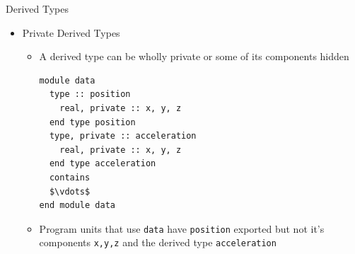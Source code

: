 \documentclass[c,mathserif,compress,xcolor=svgnames]{beamer}
\newcommand{\lstfortran}[1]{\lstinline[language={[90]Fortran},basicstyle=\footnotesize\ttfamily]|#1|}
\begin{document}
\begin{frame}{Derived Types}
\begin{itemize}
  \item Private Derived Types
    \begin{itemize}
      \item A derived type can be wholly private or some of its components hidden
        \begin{lstlisting}[language={[90]Fortran},basicstyle=\fontsize{5}{6}\selectfont\ttfamily,mathescape]
module data
  type :: position
    real, private :: x, y, z
  end type position
  type, private :: acceleration
    real, private :: x, y, z
  end type acceleration
  contains
  $\vdots$
end module data
          \end{lstlisting}
      \item Program units that use \lstfortran{data} have \lstfortran{position} exported but not it's components \lstfortran{x,y,z} and the derived type \lstfortran{acceleration}
    \end{itemize}
  \end{itemize}
\end{frame}
\end{document}
